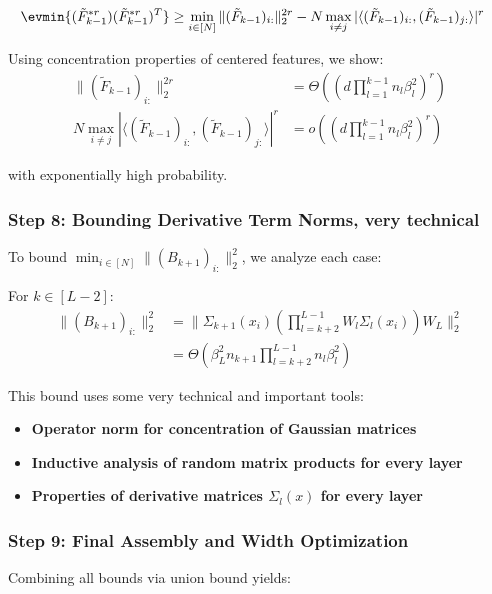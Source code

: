\documentclass[a4paper]{article}
\begin{document}
\begin{align}
\evmin{(\tilde{F}_{k-1}^{*r})(\tilde{F}_{k-1}^{*r})^T} &\geq \min_{i \in [N]} \|(\tilde{F}_{k-1})_{i:}\|_2^{2r} - N \max_{i \neq j} |\langle (\tilde{F}_{k-1})_{i:}, (\tilde{F}_{k-1})_{j:} \rangle|^r
\end{align}

Using concentration properties of centered features, we show:
\begin{align}
\|(\tilde{F}_{k-1})_{i:}\|_2^{2r} &= \Theta\left(\left(d \prod_{l=1}^{k-1} n_l \beta_l^2\right)^r\right) \\
N \max_{i \neq j} |\langle (\tilde{F}_{k-1})_{i:}, (\tilde{F}_{k-1})_{j:} \rangle|^r &= o\left(\left(d \prod_{l=1}^{k-1} n_l \beta_l^2\right)^r\right)
\end{align}

with exponentially high probability.

\subsubsection{Step 8: Bounding Derivative Term Norms, very technical}

To bound $\min_{i \in [N]} \|(B_{k+1})_{i:}\|_2^2$, we analyze each case:

For $k \in [L-2]$:
\begin{align}
\|(B_{k+1})_{i:}\|_2^2 &= \|\Sigma_{k+1}(x_i) \left(\prod_{l=k+2}^{L-1} W_l \Sigma_l(x_i)\right) W_L\|_2^2 \\
&= \Theta\left(\beta_L^2 n_{k+1} \prod_{l=k+2}^{L-1} n_l \beta_l^2\right)
\end{align}

This bound uses some very technical and important tools:
\begin{itemize}
    \item \textbf{Operator norm for  concentration of Gaussian matrices}
    \item \textbf{Inductive analysis of random matrix products for every layer}
    \item \textbf{Properties of derivative matrices $\Sigma_l(x)$ for every layer}
\end{itemize}

\subsubsection{Step 9: Final Assembly and Width Optimization}

Combining all bounds via union bound yields:
\end{document}
